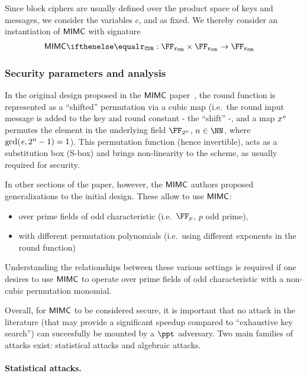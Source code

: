 Since block ciphers are usually defined over the product space of keys and messages, we consider the variables $c$, \rounds{} and \exponent{} as fixed. We thereby consider an instantiation of $\mathsf{MIMC{}}$ with signature
\begin{align*}
    \mimcPrime{\rCURVE} &: \FFx{\rCURVE} \times \FFx{\rCURVE} \to \FFx{\rCURVE}
\end{align*}

\subsubsection{Security parameters and analysis}\label{instantiation:mkhash:mimc-encryption:security}

In the original design proposed in the $\mathsf{MIMC{}}$ paper~\cite{albrecht2016mimc}, the round function is represented as a ``shifted'' permutation via a cubic map (i.e.~the round input message is added to the key and round constant - the ``shift'' -, and a map $x^{\mathit{e}{}}$ permutes the element in the underlying field $\FF_{2^n}$, $n \in \NN$, where $\gcd(\mathit{e}{}, 2^n - 1) = 1$). This permutation function (hence invertible), acts as a substitution box (S-box) and brings non-linearity to the scheme, as usually required for security.

In other sections of the paper, however, the $\mathsf{MIMC{}}$ authors proposed generalizations to the initial design. These allow to use $\mathsf{MIMC{}}$:
\begin{itemize}
    \item over prime fields of odd characteristic (i.e.~$\FF_p$, $p$ odd prime),
    \item with different permutation polynomials (i.e.~using different exponents in the round function)
\end{itemize}

Understanding the relationships between these various settings is required if one desires to use $\mathsf{MIMC{}}$ to operate over prime fields of odd characteristic with a non-cubic permutation monomial.

Overall, for $\mathsf{MIMC{}}$ to be considered secure, it is important that no attack in the literature  (that may provide a significant speedup compared to ``exhaustive key search'') can succesfully be mounted by a $\ppt$ adversary. Two main families of attacks exist: statistical attacks and algebraic attacks.

\paragraph{Statistical attacks.}

